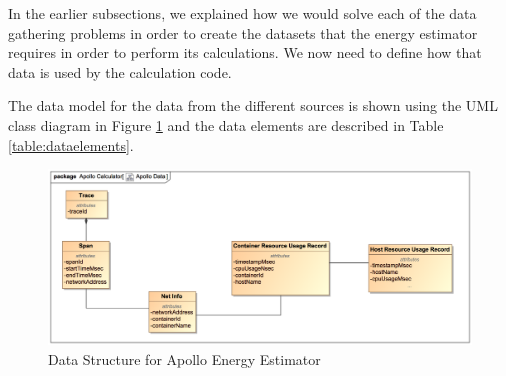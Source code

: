 In the earlier subsections, we explained how we would solve each of the data gathering problems in order to create the datasets that the energy estimator requires in order to perform its calculations.  We now need to define how that data is used by the calculation code.

The data model for the data from the different sources is shown using the UML class diagram in Figure \ref{figure:data} and the data elements are described in Table \ref{table:dataelements}.

\begin{figure}
\centering
\includegraphics[width=1.0\textwidth]{Figures/implementation-data}
\caption{Data Structure for Apollo Energy Estimator}
\label{figure:data}
\end{figure}

